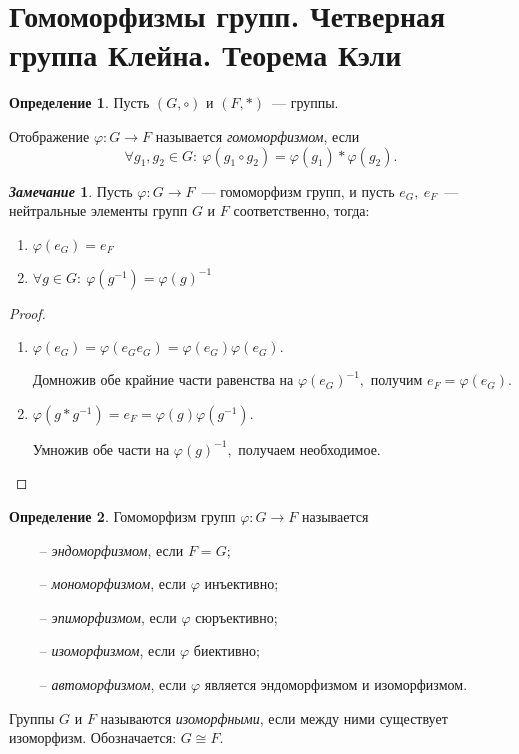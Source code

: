\documentclass[a4paper, 14pt]{extarticle}
\newcommand{\n}{\par}
\newcommand{\suchthat}{{:}{ } \ }
\renewcommand{\phi}{\varphi}
\theoremstyle{definition}
\newtheorem*{remark}{\textit{Замечание}}
\newtheorem{definition}{Определение}
\theoremstyle{plain}
\numberwithin{theorem}{section}
\numberwithin{definition}{section}
\numberwithin{statement}{section}
\numberwithin{lemma}{section}
\numberwithin{consequence}{section}
\begin{document}
	\section{Гомоморфизмы групп. Четверная группа Клейна. Теорема Кэли}
	\setcounter{definition}{0}
	\begin{definition}
		Пусть $(G, \circ)$ и $( F, *)$~--- группы.
		\n
		Отображение $\phi: G \rightarrow F$ называется \textit{гомоморфизмом}, если
		\begin{equation*}
			\forall g_1, g_2 \in G\suchthat \phi(g_1 \circ g_2) = \phi(g_1) * \phi(g_2).
		\end{equation*}
	\end{definition}
	\begin{remark}
		Пусть ${\phi: G \rightarrow F}$~--- гомоморфизм групп, и пусть ${e_G, \ e_F}$~--- нейтральные элементы групп $G$ и $F$ соответственно, тогда:
		\begin{enumerate}
			\setlength\itemsep{0.1em}
			\item $\phi(e_G) = e_F$
			\item $\forall g \in G\suchthat \phi(g^{-1}) = \phi(g)^{-1}$
		\end{enumerate}
	\end{remark}
	\begin{proof}
		\
		\begin{enumerate}
			\setlength\itemsep{0.1em}
			\item $\phi(e_G) = \phi(e_Ge_G) = \phi(e_G)\phi(e_G).$ \n
			Домножив обе крайние части равенства на $\phi(e_G)^{-1},$ получим
			${e_F = \phi(e_G).}$
			\item $\phi(g * g^{-1}) = e_F = \phi(g)\phi(g^{-1}).$ \n
			Умножив обе части на $\phi(g)^{-1},$ получаем необходимое. \qedhere
		\end{enumerate}
	\end{proof}
	\begin{definition}
		Гомоморфизм групп ${\phi: G \rightarrow F}$ называется 
		\begin{itemize}
			\item [~--] \textit{эндоморфизмом}, если $F = G$;
			\item [~--] \textit{мономорфизмом}, если $\phi$ инъективно;
			\item [~--] \textit{эпиморфизмом}, если $\phi$ сюръективно;
			\item [~--] \textit{изоморфизмом}, если $\phi$ биективно;
			\item [~--] \textit{автоморфизмом}, если $\phi$ является эндоморфизмом и изоморфизмом.
		\end{itemize} \n
		Группы $G$ и $F$ называются \textit{изоморфными}, если между ними существует изоморфизм. Обозначается: $G \cong F.$
	\end{definition}
\end{document}
